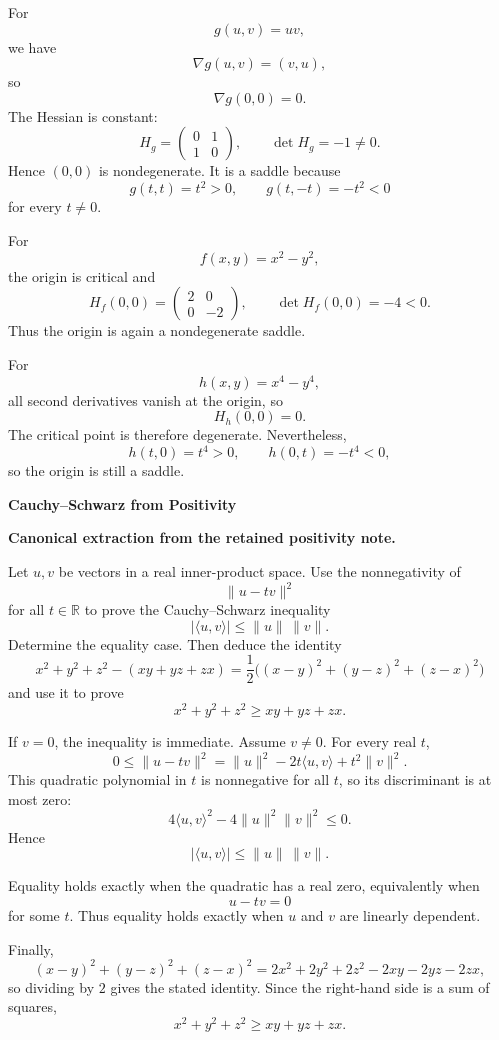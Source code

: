 \begin{solution}
For
\[
g(u,v)=uv,
\]
we have
\[
\nabla g(u,v)=(v,u),
\]
so
\[
\nabla g(0,0)=0.
\]
The Hessian is constant:
\[
H_g=
\begin{pmatrix}
0&1\\
1&0
\end{pmatrix},
\qquad
\det H_g=-1\ne0.
\]
Hence \((0,0)\) is nondegenerate. It is a saddle because
\[
g(t,t)=t^2>0,
\qquad
g(t,-t)=-t^2<0
\]
for every \(t\ne0\).

For
\[
f(x,y)=x^2-y^2,
\]
the origin is critical and
\[
H_f(0,0)=
\begin{pmatrix}
2&0\\
0&-2
\end{pmatrix},
\qquad
\det H_f(0,0)=-4<0.
\]
Thus the origin is again a nondegenerate saddle.

For
\[
h(x,y)=x^4-y^4,
\]
all second derivatives vanish at the origin, so
\[
H_h(0,0)=0.
\]
The critical point is therefore degenerate. Nevertheless,
\[
h(t,0)=t^4>0,
\qquad
h(0,t)=-t^4<0,
\]
so the origin is still a saddle.
\end{solution}

\begin{problem}[CP-I-0030]
\label{prob:cp-i-0030}
\textbf{Cauchy--Schwarz from Positivity}

\textbf{Canonical extraction from the retained positivity note.}

\hspace*{1.5em}Let \(u,v\) be vectors in a real inner-product space. Use the nonnegativity of
\[
\|u-tv\|^2
\]
for all \(t\in\mathbb R\) to prove the Cauchy--Schwarz inequality
\[
|\langle u,v\rangle|
\le
\|u\|\,\|v\|.
\]
Determine the equality case. Then deduce the identity
\[
x^2+y^2+z^2-(xy+yz+zx)
=
\frac12\bigl((x-y)^2+(y-z)^2+(z-x)^2\bigr)
\]
and use it to prove
\[
x^2+y^2+z^2\ge xy+yz+zx.
\]
\end{problem}

\begin{solution}
If \(v=0\), the inequality is immediate. Assume \(v\ne0\). For every real \(t\),
\[
0
\le
\|u-tv\|^2
=
\|u\|^2-2t\langle u,v\rangle+t^2\|v\|^2.
\]
This quadratic polynomial in \(t\) is nonnegative for all \(t\), so its discriminant is at most
zero:
\[
4\langle u,v\rangle^2
-
4\|u\|^2\|v\|^2
\le0.
\]
Hence
\[
|\langle u,v\rangle|
\le
\|u\|\,\|v\|.
\]

Equality holds exactly when the quadratic has a real zero, equivalently when
\[
u-tv=0
\]
for some \(t\). Thus equality holds exactly when \(u\) and \(v\) are linearly dependent.

Finally,
\[
(x-y)^2+(y-z)^2+(z-x)^2
=
2x^2+2y^2+2z^2-2xy-2yz-2zx,
\]
so dividing by \(2\) gives the stated identity. Since the right-hand side is a sum of squares,
\[
x^2+y^2+z^2\ge xy+yz+zx.
\]
\end{solution}

